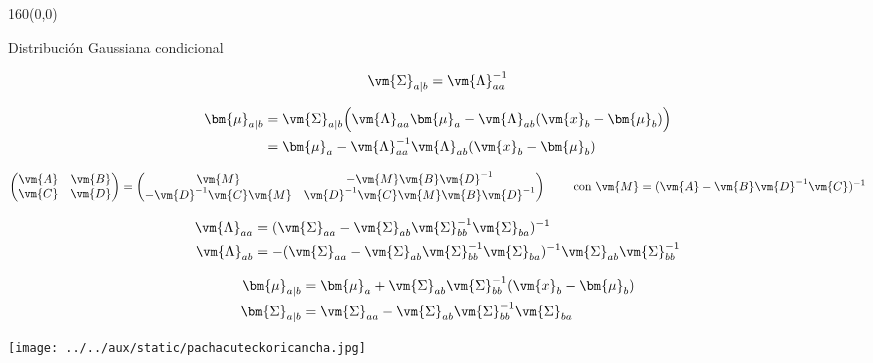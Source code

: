 \documentclass[shownotes,aspectratio=169]{beamer}
\begin{document}
\begin{frame}[plain]
 \begin{textblock}{160}(0,0)
\begin{center}
 \Large Distribuci\'on Gaussiana condicional
\end{center}
\end{textblock}
\vspace{0.75cm}

\begin{align*}
 \vm{\Sigma}_{a|b} = \vm{\Lambda}_{aa}^{-1}
\end{align*}

\begin{align*}
 \bm{\mu}_{a|b} & = \vm{\Sigma}_{a|b} \Big( \vm{\Lambda}_{aa} \bm{\mu}_a  - \vm{\Lambda}_{ab}(\vm{x}_b-\bm{\mu}_b)  \Big) \\
 & = \bm{\mu}_a - \vm{\Lambda}_{aa}^{-1} \vm{\Lambda}_{ab}(\vm{x}_b-\bm{\mu}_b)
\end{align*}

\begin{align*}
 \begin{pmatrix} \vm{A} & \vm{B} \\ \vm{C} & \vm{D} \end{pmatrix}  
 = 
 \begin{pmatrix} 
 \vm{M} &  -\vm{M}\vm{B}\vm{D}^{-1}  \\
 -\vm{D}^{-1}\vm{C}\vm{M}  & \vm{D}^{-1} \vm{C}\vm{M}\vm{B}\vm{D}^{-1} 
 \end{pmatrix}
 \hspace{0.8cm} \text{con } \vm{M} = (\vm{A}-\vm{B}\vm{D}^{-1}\vm{C})^{-1} 
\end{align*}

\begin{align*}
 \vm{\Lambda}_{aa} & = ( \vm{\Sigma}_{aa} - \vm{\Sigma}_{ab} \vm{\Sigma}_{bb}^{-1} \vm{\Sigma}_{ba} )^{-1} \\
 \vm{\Lambda}_{ab} & = -( \vm{\Sigma}_{aa} - \vm{\Sigma}_{ab} \vm{\Sigma}_{bb}^{-1} \vm{\Sigma}_{ba} )^{-1}  \vm{\Sigma}_{ab}  \vm{\Sigma}_{bb}^{-1}
\end{align*}

\begin{mdframed}[backgroundcolor=black!20]
\begin{equation*}
\begin{split}
 \bm{\mu}_{a|b} & = \bm{\mu}_a + \vm{\Sigma}_{ab}  \vm{\Sigma}_{bb}^{-1} (\vm{x}_b-\bm{\mu}_b)\\
 \bm{\Sigma}_{a|b} & = \vm{\Sigma}_{aa} - \vm{\Sigma}_{ab} \vm{\Sigma}_{bb}^{-1} \vm{\Sigma}_{ba} \\
 \end{split}
\end{equation*}
\end{mdframed}






\end{frame}



\begin{frame}[plain]
\centering
  \texttt{[image: ../../aux/static/pachacuteckoricancha.jpg]}
\end{frame}
\end{document}
